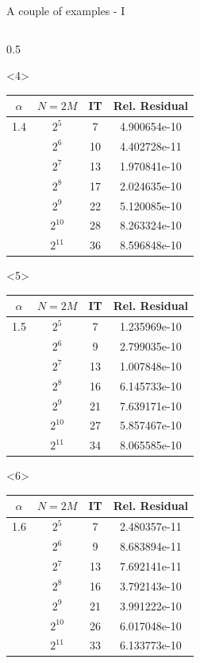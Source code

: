 \documentclass[aspectratio=169,xcolor=dvipsnames]{beamer}
\begin{document}
\begin{frame}[fragile]{A couple of examples - I}
\begin{columns}
\begin{column}{0.5\columnwidth}
\begin{onlyenv}
\end{onlyenv}
\begin{onlyenv}<4>
	\centering
	
	\begin{tabular}{cccc}
		\toprule
		$\alpha$ & $N = 2M$ & IT & Rel. Residual \\
		\midrule
 1.4 & $2^{5}$ & 7 & 4.900654e-10 \\
& $2^{6}$ & 10 & 4.402728e-11 \\
& $2^{7}$ & 13 & 1.970841e-10 \\
& $2^{8}$ & 17 & 2.024635e-10 \\
& $2^{9}$ & 22 & 5.120085e-10 \\
& $2^{10}$ & 28 & 8.263324e-10 \\
& $2^{11}$ & 36 & 8.596848e-10 \\
\bottomrule
\end{tabular}

\end{onlyenv}
\begin{onlyenv}<5>
	\centering
	
	\begin{tabular}{cccc}
		\toprule
		$\alpha$ & $N = 2M$ & IT & Rel. Residual \\
		\midrule
1.5 & $2^{5}$ & 7 & 1.235969e-10 \\
& $2^{6}$ & 9 & 2.799035e-10 \\
& $2^{7}$ & 13 & 1.007848e-10 \\
& $2^{8}$ & 16 & 6.145733e-10 \\
& $2^{9}$ & 21 & 7.639171e-10 \\
& $2^{10}$ & 27 & 5.857467e-10 \\
& $2^{11}$ & 34 & 8.065585e-10 \\
\bottomrule
\end{tabular}

\end{onlyenv}
\begin{onlyenv}<6>
	\centering
	
	\begin{tabular}{cccc}
		\toprule
		$\alpha$ & $N = 2M$ & IT & Rel. Residual \\
		\midrule
1.6 & $2^{5}$ & 7 & 2.480357e-11 \\
& $2^{6}$ & 9 & 8.683894e-11 \\
& $2^{7}$ & 13 & 7.692141e-11 \\
& $2^{8}$ & 16 & 3.792143e-10 \\
& $2^{9}$ & 21 & 3.991222e-10 \\
& $2^{10}$ & 26 & 6.017048e-10 \\
& $2^{11}$ & 33 & 6.133773e-10 \\
\bottomrule
\end{tabular}


\end{onlyenv}
\end{column}
\end{columns}
\end{frame}
\end{document}
